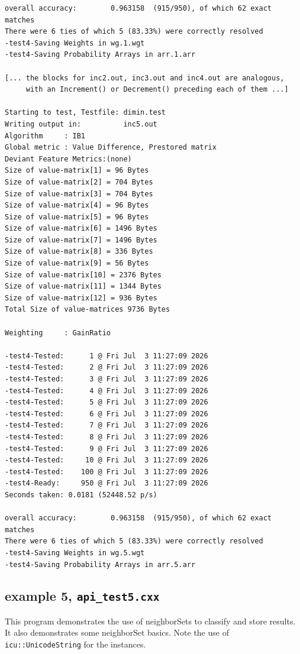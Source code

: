 \documentclass{report}
\begin{document}
\begin{footnotesize}
\begin{verbatim}
overall accuracy:        0.963158  (915/950), of which 62 exact matches
There were 6 ties of which 5 (83.33%) were correctly resolved
-test4-Saving Weights in wg.1.wgt
-test4-Saving Probability Arrays in arr.1.arr

[... the blocks for inc2.out, inc3.out and inc4.out are analogous,
     with an Increment() or Decrement() preceding each of them ...]

Starting to test, Testfile: dimin.test
Writing output in:          inc5.out
Algorithm     : IB1
Global metric : Value Difference, Prestored matrix
Deviant Feature Metrics:(none)
Size of value-matrix[1] = 96 Bytes
Size of value-matrix[2] = 704 Bytes
Size of value-matrix[3] = 704 Bytes
Size of value-matrix[4] = 96 Bytes
Size of value-matrix[5] = 96 Bytes
Size of value-matrix[6] = 1496 Bytes
Size of value-matrix[7] = 1496 Bytes
Size of value-matrix[8] = 336 Bytes
Size of value-matrix[9] = 56 Bytes
Size of value-matrix[10] = 2376 Bytes
Size of value-matrix[11] = 1344 Bytes
Size of value-matrix[12] = 936 Bytes
Total Size of value-matrices 9736 Bytes

Weighting     : GainRatio

-test4-Tested:      1 @ Fri Jul  3 11:27:09 2026
-test4-Tested:      2 @ Fri Jul  3 11:27:09 2026
-test4-Tested:      3 @ Fri Jul  3 11:27:09 2026
-test4-Tested:      4 @ Fri Jul  3 11:27:09 2026
-test4-Tested:      5 @ Fri Jul  3 11:27:09 2026
-test4-Tested:      6 @ Fri Jul  3 11:27:09 2026
-test4-Tested:      7 @ Fri Jul  3 11:27:09 2026
-test4-Tested:      8 @ Fri Jul  3 11:27:09 2026
-test4-Tested:      9 @ Fri Jul  3 11:27:09 2026
-test4-Tested:     10 @ Fri Jul  3 11:27:09 2026
-test4-Tested:    100 @ Fri Jul  3 11:27:09 2026
-test4-Ready:     950 @ Fri Jul  3 11:27:09 2026
Seconds taken: 0.0181 (52448.52 p/s)

overall accuracy:        0.963158  (915/950), of which 62 exact matches
There were 6 ties of which 5 (83.33%) were correctly resolved
-test4-Saving Weights in wg.5.wgt
-test4-Saving Probability Arrays in arr.5.arr
\end{verbatim}
\end{footnotesize}
\clearpage

\subsection{example 5, {\tt api\_test5.cxx}}

This program demonstrates the use of neighborSets to classify and
store results. It also demonstrates some neighborSet basics. Note the
use of {\tt icu::UnicodeString} for the instances.
\end{document}
